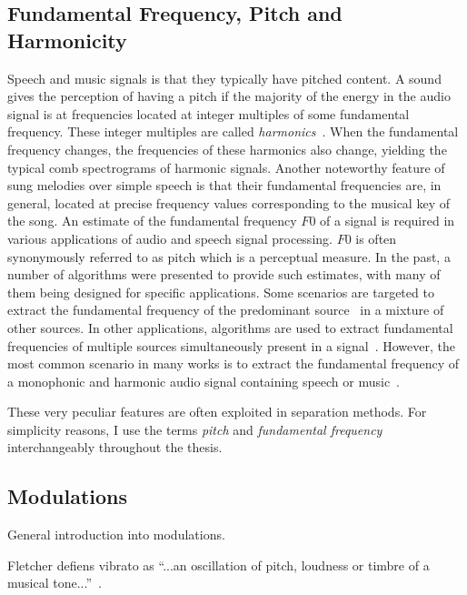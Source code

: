 \subsection{Fundamental Frequency, Pitch and Harmonicity}
Speech and music signals is that they typically have pitched content.
A sound gives the perception of having a pitch if the majority of the energy in the audio signal is at frequencies located at integer multiples of some fundamental frequency.
These integer multiples are called \textit{harmonics}~\cite{schenker54}.
When the fundamental frequency changes, the frequencies of these harmonics also change, yielding the typical comb spectrograms of harmonic signals.
Another noteworthy feature of sung melodies over simple speech is that their fundamental frequencies are, in general, located at precise frequency values corresponding to the musical key of the song.
An estimate of the fundamental frequency $F0$ of a signal is required in various applications of audio and speech signal processing.
$F0$ is often synonymously referred to as pitch which is a perceptual measure. In the past, a number of algorithms were presented to provide such estimates, with many of them being designed for specific applications.
Some scenarios are targeted to extract the fundamental frequency of the predominant source~\cite{salamon12} in a mixture of other sources.
In other applications, algorithms are used to extract fundamental frequencies of multiple sources simultaneously present in a signal~\cite{klapuri03}.
However, the most common scenario in many works is to extract the fundamental frequency of a monophonic and harmonic audio signal containing speech or music~\cite{talkin95, boersma02, decheveigne02, resch07, camacho07, tidhar10, christensen07}.

These very peculiar features are often exploited in separation methods.
For simplicity reasons, I use the terms \textit{pitch} and \textit{fundamental frequency} interchangeably throughout the thesis.

\subsection{Modulations}

General introduction into modulations.
\cite{abe98}

Fletcher defiens vibrato as ``...an oscillation of pitch, loudness or timbre of a musical tone...''~\cite{fletcher01}.

